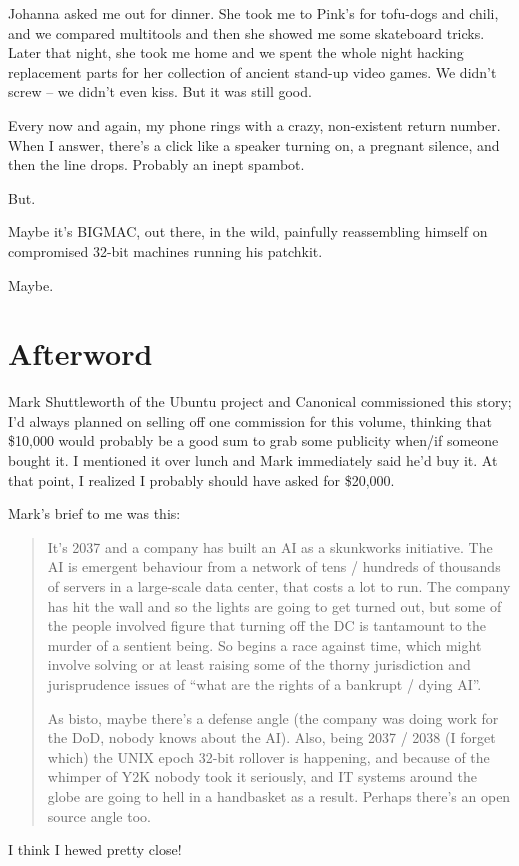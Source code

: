 Johanna asked me out for dinner. She took me to Pink's for tofu-dogs 
and chili, and we compared multitools and then she showed me some 
skateboard tricks. Later that night, she took me home and we spent the 
whole night hacking replacement parts for her collection of ancient 
stand-up video games. We didn't screw -- we didn't even kiss. But it 
was still good.

Every now and again, my phone rings with a crazy, non-existent return 
number. When I answer, there's a click like a speaker turning on, a 
pregnant silence, and then the line drops. Probably an inept spambot.

But.

Maybe it's BIGMAC, out there, in the wild, painfully reassembling 
himself on compromised 32-bit machines running his patchkit.

Maybe.

\section{Afterword}

Mark Shuttleworth of the Ubuntu project and Canonical commissioned this 
story; I'd always planned on selling off one commission for this 
volume, thinking that \$10,000 would probably be a good sum to grab 
some publicity when/if someone bought it. I mentioned it over lunch and 
Mark immediately said he'd buy it. At that point, I realized I probably 
should have asked for \$20,000.

Mark's brief to me was this:

\begin{quotation}
It's 2037 and a company has built an AI as a skunkworks initiative. The 
AI is emergent behaviour from a network of tens / hundreds of thousands 
of servers in a large-scale data center, that costs a lot to run. The 
company has hit the wall and so the lights are going to get turned out, 
but some of the people involved figure that turning off the DC is 
tantamount to the murder of a sentient being. So begins a race against 
time, which might involve solving or at least raising some of the 
thorny jurisdiction and jurisprudence issues of “what are the rights 
of a bankrupt / dying AI”.

As bisto, maybe there's a defense angle (the company was doing work for 
the DoD, nobody knows about the AI). Also, being 2037 / 2038 (I forget 
which) the UNIX epoch 32-bit rollover is happening, and because of the 
whimper of Y2K nobody took it seriously, and IT systems around the 
globe are going to hell in a handbasket as a result. Perhaps there's an 
open source angle too.\erratum{*}{}
\end{quotation}

I think I hewed pretty close!

